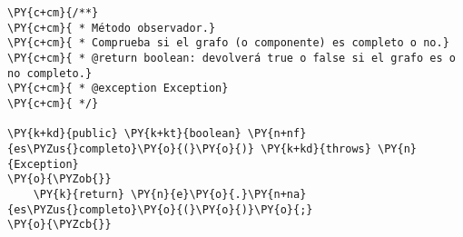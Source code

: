\begin{Verbatim}[commandchars=\\\{\}]
\PY{c+cm}{/**}
\PY{c+cm}{ * Método observador.}
\PY{c+cm}{ * Comprueba si el grafo (o componente) es completo o no.}
\PY{c+cm}{ * @return boolean: devolverá true o false si el grafo es o no completo.}
\PY{c+cm}{ * @exception Exception}
\PY{c+cm}{ */}

\PY{k+kd}{public} \PY{k+kt}{boolean} \PY{n+nf}{es\PYZus{}completo}\PY{o}{(}\PY{o}{)} \PY{k+kd}{throws} \PY{n}{Exception}
\PY{o}{\PYZob{}}
    \PY{k}{return} \PY{n}{e}\PY{o}{.}\PY{n+na}{es\PYZus{}completo}\PY{o}{(}\PY{o}{)}\PY{o}{;}
\PY{o}{\PYZcb{}}
\end{Verbatim}
